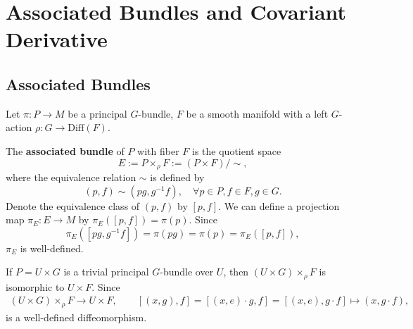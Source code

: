 \section{Associated Bundles and Covariant Derivative}
\subsection{Associated Bundles}
Let $\pi: P\to M$ be a principal $G$-bundle, $F$ be a smooth manifold with a left $G$-action $\rho:G\to\mathrm{Diff}(F)$. 
\begin{definition}
    The \textbf{associated bundle} of $P$ with fiber $F$ is the quotient space 
    \begin{equation*}
        E := P\times_\rho F := (P\times F)/\sim,
    \end{equation*}
    where the equivalence relation $\sim$ is defined by 
    \begin{equation*}
        (p, f)\sim (pg, g^{-1}f),\quad \forall p\in P, f\in F, g\in G.
    \end{equation*} 
    Denote the equivalence class of $(p, f)$ by $[p, f]$.
    We can define a projection map $\pi_E: E\to M$ by $\pi_E([p, f]) = \pi(p)$. Since 
    \begin{equation*}
        \pi_E([pg, g^{-1}f]) = \pi(pg) = \pi(p) = \pi_E([p, f]),
    \end{equation*}
    $\pi_E$ is well-defined. 
\end{definition}
\begin{example}
    If $P = U\times G$ is a trivial principal $G$-bundle over $U$, 
    then $(U\times G)\times_\rho F$ is isomorphic to $U\times F$. Since 
    \begin{align*}
        (U\times G)\times_\rho F \to U\times F,\qquad
        [(x, g), f] = [(x, e)\cdot g, f] = [(x, e), g\cdot f] \mapsto (x, g\cdot f),
    \end{align*}
    is a well-defined diffeomorphism.
\end{example}
